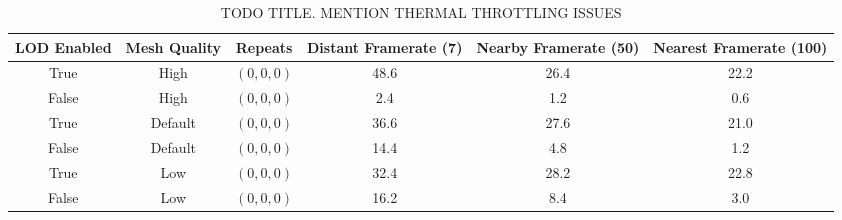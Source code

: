 \begin{table}
  \begin{center}
  \begin{adjustbox}{width=\textwidth}
    \begin{tabular}{|c|c|c|c|c|c|}
    \hline
    LOD Enabled & Mesh Quality & Repeats & Distant Framerate (7) & Nearby Framerate (50) & Nearest Framerate (100)\\
    \hline
    \hline
    True & High & $(0,0,0)$ & 48.6 & 26.4 & 22.2 \\
    \hline
    False & High & $(0,0,0)$ & 2.4 & 1.2 & 0.6 \\
    \hline
    True & Default & $(0,0,0)$ & 36.6 & 27.6 & 21.0 \\
    \hline
    False & Default & $(0,0,0)$ & 14.4 & 4.8 & 1.2 \\
    \hline
    True & Low & $(0,0,0)$ & 32.4 & 28.2 & 22.8\\
    \hline
    False & Low & $(0,0,0)$ & 16.2 & 8.4 & 3.0 \\
    \hline
    \end{tabular}
  \end{adjustbox}
  \end{center}
  \caption{TODO TITLE. MENTION THERMAL THROTTLING ISSUES}
  \label{tab:lod_test}
\end{table}
